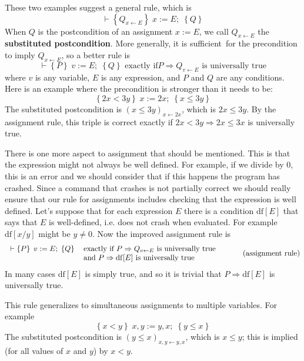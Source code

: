 \documentclass[muchmore,11pt]{article}%
\begin{document}
These two examples suggest a general rule, which is%
\[
\vdash\left\{  Q_{x\leftarrow E}\right\}  \;x:=E;\;\left\{  Q\right\}
\]
When $Q$ is the postcondition of an assignment $x:=E$, we call $Q_{x\leftarrow
E}$ the \textbf{substituted postcondition}. More generally, it is
sufficient\ for the precondition to imply $Q_{x\leftarrow E}$, so a better
rule is%
\begin{equation}
\vdash\left\{  P\right\}  \;v:=E;\;\left\{  Q\right\}  \text{ exactly if
}P\Rightarrow Q_{v\leftarrow E}\text{ is universally true}\nonumber
\end{equation}
where $v$ is any variable, $E$ is any expression, and $P$ and $Q$ are any
conditions. Here is an example where the precondition is stronger than it
needs to be:%
\[
\left\{  2x<3y\right\}  \;x:=2x;\;\left\{  x\leq3y\right\}
\]
The substituted postcondition is $(x\leq3y)_{x\leftarrow2x}$, which is
$2x\leq3y$. By the assignment rule, this triple is correct exactly if
$2x<3y\Rightarrow2x\leq3x$ is universally true.

There is one more aspect to assignment that should be mentioned. This is that
the expression might not always be well defined. For example, if we divide by
$0$, this is an error and we should consider that if this happens the program
has crashed. Since a command that crashes is not partially correct we should
really ensure that our rule for assignments includes checking that the
expression is well defined. Let's suppose that for each expression $E$ there
is a condition $\mathrm{df}[E]$ that says that $E$ is well-defined, i.e. does
not crash when evaluated. For example $\mathrm{df}[x/y]$ might be $y\neq0$.
Now the improved assignment rule is
\begin{equation}%
\begin{tabular}
[c]{ll}%
$\vdash\left\{  P\right\}  \;v:=E;\;\left\{  Q\right\}  $ & $\text{exactly if
}P\Rightarrow Q_{v\leftarrow E}\text{ is universally true}$\\
& $\text{and }P\Rightarrow\mathrm{df}[E]\text{ is universally true}$%
\end{tabular}
\ \ \text{ }\tag{assignment rule}%
\end{equation}
In many cases $\mathrm{df}[E]$ is simply $\mathrm{true}$, and so it is trivial
that $P\Rightarrow\mathrm{df}[E]$ is universally true.

This rule generalizes to simultaneous assignments to multiple variables. For
example%
\[
\left\{  x<y\right\}  \;x,y:=y,x;\;\left\{  y\leq x\right\}
\]
The substituted postcondition is $\left(  y\leq x\right)  _{x,y\leftarrow
y,x}$, which is $x\leq y$; this is implied (for all values of $x$ and $y$) by
$x<y$.
\end{document}
